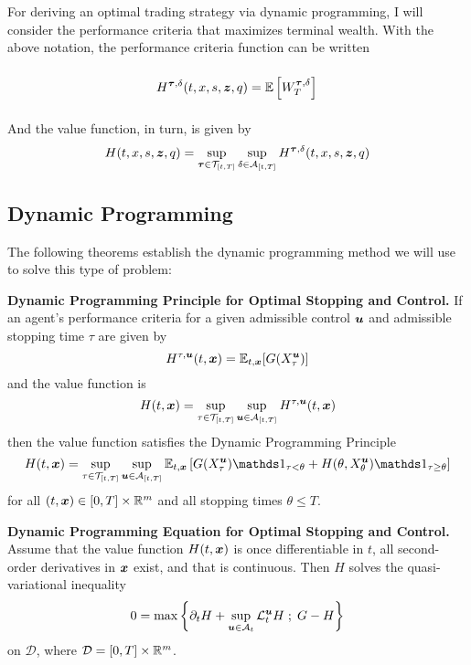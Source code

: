 For deriving an optimal trading strategy via dynamic programming, I will consider the performance criteria that maximizes terminal wealth. With the above notation, the performance criteria function can be written 
\begin{equation}\label{eq:performancecriteria}
H^{\bm{\tau}, \delta}(t,x,s,\bm{z},q) = \mathbb{E} \left[ W_T^{\bm{\tau}, \delta} \right]\vphantom{\int\limits_t^T}
\end{equation}
And the value function, in turn, is given by
\begin{equation}\label{eq:valuefunction}
H(t,x,s,\bm{z},q) = \sup\limits_{\bm{\tau} \in \mathcal{T}_{[t,T]}} \sup\limits_{\delta \in \mathcal{A}_{[t,T]}} H^{\bm{\tau}, \delta}(t,x,s,\bm{z},q)
\end{equation}

\subsection{Dynamic Programming}
The following theorems establish the dynamic programming method we will use to solve this type of problem:
\begin{thm} \textbf{Dynamic Programming Principle for Optimal Stopping and Control.}
If an agent's performance criteria for a given admissible control $\bm{u}$ and admissible stopping time $\tau$ are given by
\[ H^{\tau, \bm{u}}(t,\bm{x}) = \mathbb{E}_{t,\bm{x}} [ G (X^{\bm{u}}_\tau)] \]
and the value function is
\[ H(t,\bm{x}) = \sup\limits_{\tau \in \mathcal{T}_{[t,T]}} \sup\limits_{\bm{u} \in \mathcal{A}_{[t,T]}} H^{\tau, \bm{u}}(t,\bm{x}) \]
then the value function satisfies the Dynamic Programming Principle
\begin{equation}\label{eq:thmDPP}
H(t,\bx) = \sup\limits_{\tau \in \mathcal{T}_{[t,T]}} \sup\limits_{\bu \in \cA_{[t,T]}} \E_{t,\bx} \left[ G (X^{\bu}_\tau) \indicator_{\tau<\theta} + H(\theta, X^{\bu}_\theta)\indicator_{\tau \geq \theta} \right]
\end{equation}
for all $(t,\bm{x}) \in [0,T] \times \mathbb{R}^m$ and all stopping times $\theta \leq T$.
\end{thm}
\begin{thm} \textbf{Dynamic Programming Equation for Optimal Stopping and Control.}
Assume that the value function $H(t,\bm{x})$ is once differentiable in $t$, all second-order derivatives in $\bm{x}$ exist, and that  is continuous. Then $H$ solves the quasi-variational inequality
\begin{equation}\label{eq:thmDPE}
0 = \max \left\lbrace \partial_t H + \sup \limits_{\bm{u} \in \mathcal{A}_t} \mathcal{L}^{\bm{u}}_t H \; ; \; G - H \right\rbrace
\end{equation}
on $\mathcal{D}$, where $\mathcal{D} = [0,T] \times \mathbb{R}^m$.
\end{thm}

